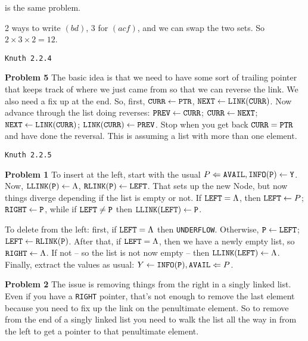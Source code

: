 \vskip 0.1in
 is the same problem.

\vskip 0.1in
 2 ways to write $\left( b d \right)$, 3 for
$\left(a c f\right)$, and we can swap the two sets.  So $2 \times 3 \times 2 = 12$.

\vfil
\break

\vskip 0.5in
\centerline {\tt Knuth 2.2.4}
\vskip 0.3in

\noindent
{\bf Problem 5} The basic idea is that we need to have some sort of
trailing pointer that keeps track of where we just came from so that 
we can reverse the link.  We also need a fix up at the end.
So, first, ${\tt CURR} \gets {\tt PTR}$, 
${\tt NEXT} \gets {\tt LINK(CURR)}$.  Now advance through the list doing reverses:
${\tt PREV} \gets {\tt CURR}$; ${\tt CURR} \gets {\tt NEXT}$; ${\tt NEXT} \gets 
{\tt LINK(CURR)}$;
${\tt LINK(CURR)} \gets {\tt PREV}$.  Stop when you get 
back ${\tt CURR} = {\tt PTR}$ and have done the reversal.
This is assuming a list with more than one element.

\vskip 0.5in
\centerline {\tt Knuth 2.2.5}
\vskip 0.3in

\noindent
{\bf Problem 1} To insert at the left, start with the usual $P \Leftarrow {\tt AVAIL},
{\tt INFO(P)} \leftarrow {\tt Y}$.  Now, ${\tt LLINK(P)} \gets \Lambda$,
${\tt RLINK(P)} \gets {\tt LEFT}$. That sets up the new Node, but now things
diverge depending if the list is empty or not.  If ${\tt LEFT} = \Lambda$, then
${\tt LEFT} \gets P$; ${\tt RIGHT} \gets {\tt P}$, while if ${\tt LEFT} \neq {\tt P}$
then ${\tt LLINK(LEFT)} \gets {\tt P}$.

To delete from the left: first, if ${\tt LEFT} = \Lambda$ then {\tt UNDERFLOW}.
Otherwise, ${\tt P} \gets {\tt LEFT}$; ${\tt LEFT} \gets {\tt RLINK(P)}$.  After that,
if ${\tt LEFT} = \Lambda$, then we have a newly empty list, so ${\tt RIGHT} \gets \Lambda$.
If not -- so the list is not now empty -- then ${\tt LLINK(LEFT)} \gets \Lambda$.  Finally,
extract the values as usual: $Y \gets {\tt INFO(P)}, {\tt AVAIL} \Leftarrow P$.

\vskip 0.1in
\noindent
{\bf Problem 2} The issue is removing things from the right in a singly linked list.
Even if you have a {\tt RIGHT} pointer, that's not enough to remove the last
element because you need to fix up the link on the penultimate element.  So
to remove from the end of a singly linked list you need to walk the list all the
way in from the left to get a pointer to that penultimate element.

